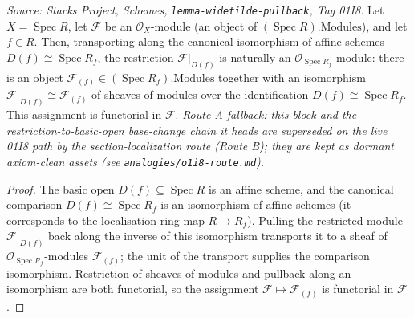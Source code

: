 \begin{lemma}
  \label{lem:modules_restrict_basicOpen}
  \textit{Source: Stacks Project, Schemes, \texttt{lemma-widetilde-pullback}, Tag 01I8.}
  Let \(X = \operatorname{Spec} R\), let \(\mathcal{F}\) be an \(\mathcal{O}_X\)-module
  (an object of \((\operatorname{Spec} R).\mathrm{Modules}\)), and let \(f \in R\). Then,
  transporting along the canonical isomorphism of affine schemes
  \(D(f) \cong \operatorname{Spec} R_f\), the restriction \(\mathcal{F}|_{D(f)}\) is naturally
  an \(\mathcal{O}_{\operatorname{Spec} R_f}\)-module: there is an object
  \(\mathcal{F}_{(f)} \in (\operatorname{Spec} R_f).\mathrm{Modules}\) together with an
  isomorphism \(\mathcal{F}|_{D(f)} \cong \mathcal{F}_{(f)}\) of sheaves of modules over the
  identification \(D(f) \cong \operatorname{Spec} R_f\). This assignment is functorial in
  \(\mathcal{F}\).
  \emph{Route-A fallback: this block and the restriction-to-basic-open base-change chain it heads are
  superseded on the live 01I8 path by the section-localization route (Route B); they are kept as
  dormant axiom-clean assets (see \texttt{analogies/o1i8-route.md}).}
\end{lemma}
\begin{proof}
  The basic open \(D(f) \subseteq \operatorname{Spec} R\) is an affine scheme, and the
  canonical comparison \(D(f) \cong \operatorname{Spec} R_f\) is an isomorphism of affine
  schemes (it corresponds to the localisation ring map \(R \to R_f\)). Pulling the restricted
  module \(\mathcal{F}|_{D(f)}\) back along the inverse of this isomorphism transports it to a
  sheaf of \(\mathcal{O}_{\operatorname{Spec} R_f}\)-modules \(\mathcal{F}_{(f)}\); the unit of
  the transport supplies the comparison isomorphism. Restriction of sheaves of modules and
  pullback along an isomorphism are both functorial, so the assignment
  \(\mathcal{F} \mapsto \mathcal{F}_{(f)}\) is functorial in \(\mathcal{F}\).
\end{proof}

